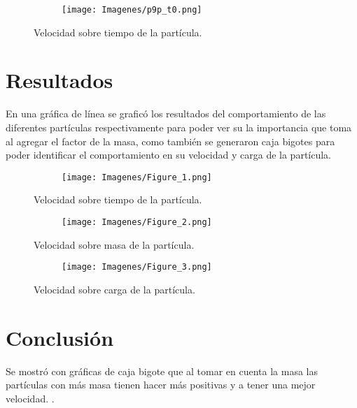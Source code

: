 \documentclass{article}
\begin{document}
\begin{figure}[H]
\centering
\begin{subfigure}[b]{1.0\linewidth}
\texttt{[image: Imagenes/p9p\_t0.png]}
\end{subfigure}
\caption{Velocidad sobre tiempo de la partícula.}
\label{fig:westminster}
\end{figure}


\newpage
\section{Resultados}
En una gráfica de línea se graficó los resultados del comportamiento de las diferentes partículas respectivamente para poder ver su la importancia que toma al agregar el factor de la masa, como también se generaron caja bigotes para poder identificar el comportamiento en su velocidad y carga de la partícula.
\begin{figure}[H]
\centering
\begin{subfigure}[b]{1.0\linewidth}
\texttt{[image: Imagenes/Figure\_1.png]}
\end{subfigure}
\caption{Velocidad sobre tiempo de la partícula.}
\label{fig:westminster}
\end{figure}

\begin{figure}[H]
\centering
\begin{subfigure}[b]{1.0\linewidth}
\texttt{[image: Imagenes/Figure\_2.png]}
\end{subfigure}
\caption{Velocidad sobre masa de la partícula.}
\label{fig:westminster}
\end{figure}

\begin{figure}[H]
\centering
\begin{subfigure}[b]{1.0\linewidth}
\texttt{[image: Imagenes/Figure\_3.png]}
\end{subfigure}
\caption{Velocidad sobre carga de la partícula.}
\label{fig:westminster}
\end{figure}
\newpage
 \section{Conclusión}
Se mostró con gráficas de caja bigote que al tomar en cuenta la masa las partículas con más masa tienen hacer más positivas y a tener una mejor velocidad. 
.

 
 

 
\end{document}
